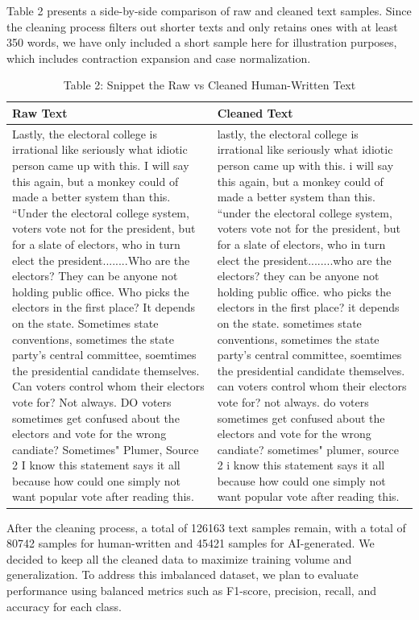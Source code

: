 \documentclass{article} %
\begin{document}
Table 2 presents a side-by-side comparison of raw and cleaned text samples. Since the cleaning process filters out shorter texts and only retains ones with at least 350 words, we have only included a short sample here for illustration purposes, which includes contraction expansion and case normalization. 

\begin{table}[H]
\caption{Table 2: Snippet the Raw vs Cleaned Human-Written Text}
\begin{tabular}{|p{6.5cm}|p{6.5cm}|}
\hline
\textbf{Raw Text} & \textbf{Cleaned Text} \\
\hline
Lastly, the electoral college is irrational like seriously what idiotic person came up with this. I will say this again, but a monkey could of made a better system than this. ``Under the electoral college system, voters vote not for the president, but for a slate of electors, who in turn elect the president........Who are the electors? They can be anyone not holding public office. Who picks the electors in the first place? It depends on the state. Sometimes state conventions, sometimes the state party's central committee, soemtimes the presidential candidate themselves. Can voters control whom their electors vote for? Not always. DO voters sometimes get confused about the electors and vote for the wrong candiate? Sometimes" Plumer, Source 2 I know this statement says it all because how could one simply not want popular vote after reading this. & lastly, the electoral college is irrational like seriously what idiotic person came up with this. i will say this again, but a monkey could of made a better system than this. ``under the electoral college system, voters vote not for the president, but for a slate of electors, who in turn elect the president........who are the electors? they can be anyone not holding public office. who picks the electors in the first place? it depends on the state. sometimes state conventions, sometimes the state party's central committee, soemtimes the presidential candidate themselves. can voters control whom their electors vote for? not always. do voters sometimes get confused about the electors and vote for the wrong candiate? sometimes" plumer, source 2 i know this statement says it all because how could one simply not want popular vote after reading this.  \\
\hline
\end{tabular}
\end{table}

After the cleaning process, a total of 126163 text samples remain, with a total of 80742 samples for human-written and 45421 samples for AI-generated. We decided to keep all the cleaned data to maximize training volume and generalization. To address this imbalanced dataset, we plan to evaluate performance using balanced metrics such as F1-score, precision, recall, and accuracy for each class.  
\end{document}
